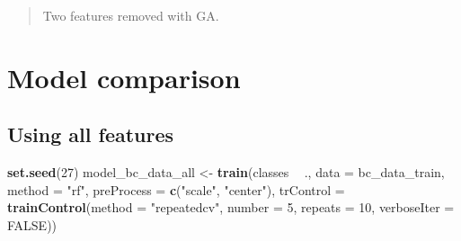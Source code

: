 \documentclass[]{book}
\newenvironment{Shaded}{\begin{snugshade}}{\end{snugshade}}
\newcommand{\DataTypeTok}[1]{\textcolor[rgb]{0.13,0.29,0.53}{#1}}
\newcommand{\DecValTok}[1]{\textcolor[rgb]{0.00,0.00,0.81}{#1}}
\newcommand{\KeywordTok}[1]{\textcolor[rgb]{0.13,0.29,0.53}{\textbf{#1}}}
\newcommand{\NormalTok}[1]{#1}
\newcommand{\OperatorTok}[1]{\textcolor[rgb]{0.81,0.36,0.00}{\textbf{#1}}}
\newcommand{\OtherTok}[1]{\textcolor[rgb]{0.56,0.35,0.01}{#1}}
\newcommand{\StringTok}[1]{\textcolor[rgb]{0.31,0.60,0.02}{#1}}
\begin{document}
\begin{quote}
Two features removed with GA.
\end{quote}

\hypertarget{model-comparison}{%
\section{Model comparison}\label{model-comparison}}

\hypertarget{using-all-features}{%
\subsection{Using all features}\label{using-all-features}}

\begin{Shaded}
\begin{Highlighting}[]
\KeywordTok{set.seed}\NormalTok{(}\DecValTok{27}\NormalTok{)}
\NormalTok{model_bc_data_all <-}\StringTok{ }\KeywordTok{train}\NormalTok{(classes }\OperatorTok{~}\StringTok{ }\NormalTok{.,}
                           \DataTypeTok{data =}\NormalTok{ bc_data_train,}
                           \DataTypeTok{method =} \StringTok{"rf"}\NormalTok{,}
                           \DataTypeTok{preProcess =} \KeywordTok{c}\NormalTok{(}\StringTok{"scale"}\NormalTok{, }\StringTok{"center"}\NormalTok{),}
                           \DataTypeTok{trControl =} \KeywordTok{trainControl}\NormalTok{(}\DataTypeTok{method =} \StringTok{"repeatedcv"}\NormalTok{, }
                                                    \DataTypeTok{number =} \DecValTok{5}\NormalTok{, }\DataTypeTok{repeats =} \DecValTok{10}\NormalTok{,}
                                                    \DataTypeTok{verboseIter =} \OtherTok{FALSE}\NormalTok{))}
\end{Highlighting}
\end{Shaded}
\end{document}
